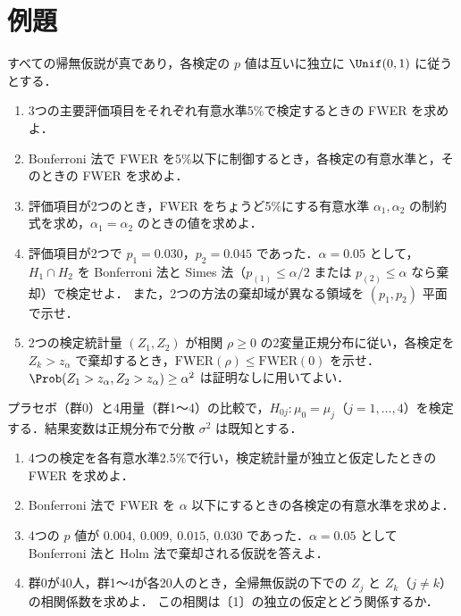 \section{例題}\label{sec:m08-reidai}
\begin{reidai}\label{reidai:m08-1}
すべての帰無仮説が真であり，各検定の $p$ 値は互いに独立に $\Unif(0,1)$ に従うとする．
\begin{enumerate}[label=〔\arabic*〕]
\item 3つの主要評価項目をそれぞれ有意水準5\%で検定するときの FWER を求めよ．
\item Bonferroni 法で FWER を5\%以下に制御するとき，各検定の有意水準と，そのときの FWER を求めよ．
\item 評価項目が2つのとき，FWER をちょうど5\%にする有意水準 $\alpha_1,\alpha_2$ の制約式を求め，$\alpha_1=\alpha_2$ のときの値を求めよ．
\item 評価項目が2つで $p_1=0.030$，$p_2=0.045$ であった．$\alpha=0.05$ として，$H_1\cap H_2$ を Bonferroni 法と Simes 法（$p_{(1)}\le\alpha/2$ または $p_{(2)}\le\alpha$ なら棄却）で検定せよ．
      また，2つの方法の棄却域が異なる領域を $(p_1,p_2)$ 平面で示せ．
\item 2つの検定統計量 $(Z_1,Z_2)$ が相関 $\rho\ge0$ の2変量正規分布に従い，各検定を $Z_k>z_\alpha$ で棄却するとき，$\mathrm{FWER}(\rho)\le\mathrm{FWER}(0)$ を示せ．
      $\Prob(Z_1>z_\alpha,Z_2>z_\alpha)\ge\alpha^2$ は証明なしに用いてよい．
\end{enumerate}
\end{reidai}

\begin{reidai}[\kakomon{2024}{4}型：多対1比較]\label{reidai:m08-2}
プラセボ（群0）と4用量（群1〜4）の比較で，$H_{0j}:\mu_0=\mu_j$（$j=1,\dots,4$）を検定する．結果変数は正規分布で分散 $\sigma^2$ は既知とする．
\begin{enumerate}[label=〔\arabic*〕]
\item 4つの検定を各有意水準2.5\%で行い，検定統計量が独立と仮定したときの FWER を求めよ．
\item Bonferroni 法で FWER を $\alpha$ 以下にするときの各検定の有意水準を求めよ．
\item 4つの $p$ 値が $0.004,\ 0.009,\ 0.015,\ 0.030$ であった．$\alpha=0.05$ として Bonferroni 法と Holm 法で棄却される仮説を答えよ．
\item 群0が40人，群1〜4が各20人のとき，全帰無仮説の下での $Z_j$ と $Z_k$（$j\ne k$）の相関係数を求めよ．
      この相関は〔1〕の独立の仮定とどう関係するか．
\end{enumerate}
\end{reidai}


